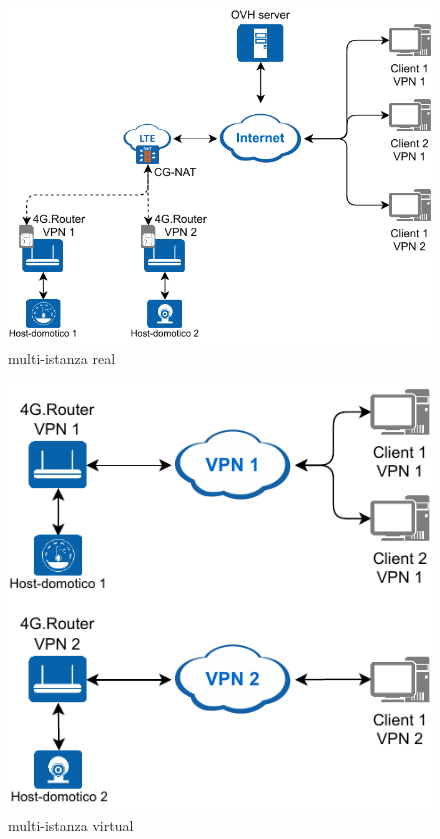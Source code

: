\begin{figure}
    \centering
    \includegraphics[width=0.8\linewidth]{immagini/diag2-multiistanza_real}
    \caption{multi-istanza real}
    \label{fig:diag2-multiistanza_real}
\end{figure}

\begin{figure}
    \centering
    \includegraphics[width=0.6\linewidth]{immagini/diag2-multiistanza_virtual}
    \caption{multi-istanza virtual}
    \label{fig:diag2-multiistanza_virtual}
\end{figure}





